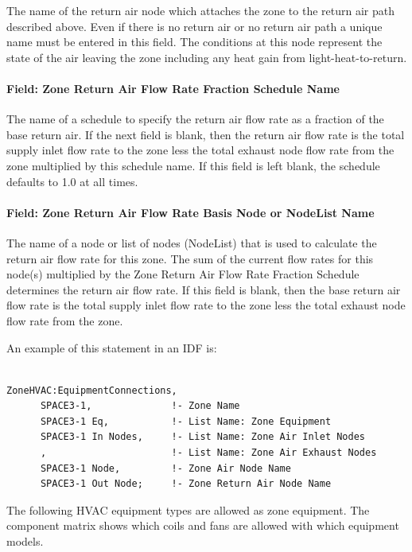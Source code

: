 The name of the return air node which attaches the zone to the return air path described above. Even if there is no return air or no return air path a unique name must be entered in this field. The conditions at this node represent the state of the air leaving the zone including any heat gain from light-heat-to-return.

\paragraph{Field: Zone Return Air Flow Rate Fraction Schedule Name}\label{field-zone-return-air-flow-rate-fraction-schedule-name}

The name of a schedule to specify the return air flow rate as a fraction of the base return air. If the next field is blank, then the return air flow rate is the total supply inlet flow rate to the zone less the total exhaust node flow rate from the zone multiplied by this schedule name. If this field is left blank, the schedule defaults to 1.0 at all times.

\paragraph{Field: Zone Return Air Flow Rate Basis Node or NodeList Name}\label{field-zone-return-air-flow-rate-basis-node-or-nodelist-name}

The name of a node or list of nodes (NodeList) that is used to calculate the return air flow rate for this zone. The sum of the current flow rates for this node(s) multiplied by the Zone Return Air Flow Rate Fraction Schedule determines the return air flow rate. If this field is blank, then the base return air flow rate is the total supply inlet flow rate to the zone less the total exhaust node flow rate from the zone.

An example of this statement in an IDF is:

\begin{lstlisting}

ZoneHVAC:EquipmentConnections,
      SPACE3-1,              !- Zone Name
      SPACE3-1 Eq,           !- List Name: Zone Equipment
      SPACE3-1 In Nodes,     !- List Name: Zone Air Inlet Nodes
      ,                      !- List Name: Zone Air Exhaust Nodes
      SPACE3-1 Node,         !- Zone Air Node Name
      SPACE3-1 Out Node;     !- Zone Return Air Node Name
\end{lstlisting}

The following HVAC equipment types are allowed as zone equipment. The component matrix shows which coils and fans are allowed with which equipment models.

